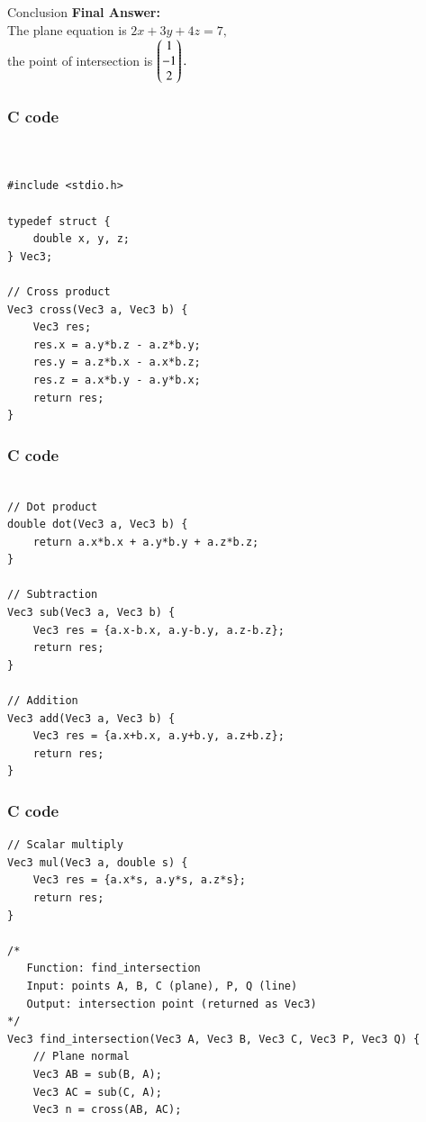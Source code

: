 \documentclass{beamer}
\begin{document}
\begin{frame}{Conclusion }
\textbf{Final Answer:} \\ 
The plane equation is
$2x + 3y + 4z = 7,$ \\the point of intersection is
$\begin{pmatrix}1 \\ -1 \\ 2\end{pmatrix}.$


\end{frame}

\begin{frame}[fragile]
    \frametitle{C code}
    \begin{lstlisting}


#include <stdio.h>

typedef struct {
    double x, y, z;
} Vec3;

// Cross product
Vec3 cross(Vec3 a, Vec3 b) {
    Vec3 res;
    res.x = a.y*b.z - a.z*b.y;
    res.y = a.z*b.x - a.x*b.z;
    res.z = a.x*b.y - a.y*b.x;
    return res;
}
\end{lstlisting}
 
\end{frame}
\begin{frame}[fragile]
    \frametitle{C code}
    \begin{lstlisting}
    
// Dot product
double dot(Vec3 a, Vec3 b) {
    return a.x*b.x + a.y*b.y + a.z*b.z;
}

// Subtraction
Vec3 sub(Vec3 a, Vec3 b) {
    Vec3 res = {a.x-b.x, a.y-b.y, a.z-b.z};
    return res;
}

// Addition
Vec3 add(Vec3 a, Vec3 b) {
    Vec3 res = {a.x+b.x, a.y+b.y, a.z+b.z};
    return res;
}
\end{lstlisting}
 
\end{frame}
\begin{frame}[fragile]
    \frametitle{C code}
    \begin{lstlisting}
// Scalar multiply
Vec3 mul(Vec3 a, double s) {
    Vec3 res = {a.x*s, a.y*s, a.z*s};
    return res;
}

/*
   Function: find_intersection
   Input: points A, B, C (plane), P, Q (line)
   Output: intersection point (returned as Vec3)
*/
Vec3 find_intersection(Vec3 A, Vec3 B, Vec3 C, Vec3 P, Vec3 Q) {
    // Plane normal
    Vec3 AB = sub(B, A);
    Vec3 AC = sub(C, A);
    Vec3 n = cross(AB, AC);
\end{lstlisting}
 
\end{frame}
\end{document}
